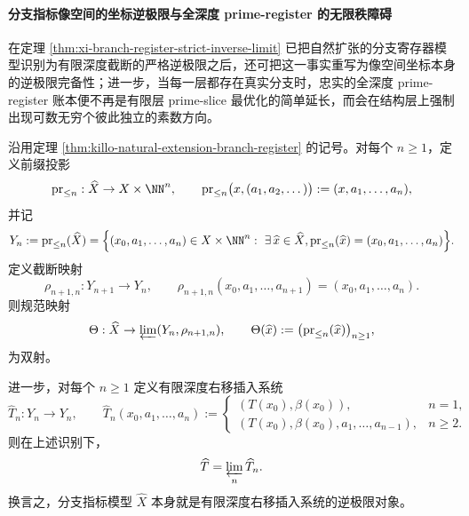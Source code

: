 \paragraph{分支指标像空间的坐标逆极限与全深度 prime-register 的无限秩障碍}
在定理 \ref{thm:xi-branch-register-strict-inverse-limit} 已把自然扩张的分支寄存器模型识别为有限深度截断的严格逆极限之后，还可把这一事实重写为像空间坐标本身的逆极限完备性；进一步，当每一层都存在真实分支时，忠实的全深度 prime-register 账本便不再是有限层 prime-slice 最优化的简单延长，而会在结构层上强制出现可数无穷个彼此独立的素数方向。

\begin{theorem}[分支指标像空间本身就是有限截断坐标系的规范逆极限]\label{thm:xi-branch-register-image-coordinate-inverse-limit}
沿用定理 \ref{thm:killo-natural-extension-branch-register} 的记号。对每个 \(n\ge 1\)，定义前缀投影
\[
\mathrm{pr}_{\le n}:\widehat X\to X\times \NN^n,
\qquad
\mathrm{pr}_{\le n}\bigl(x,(a_1,a_2,\dots)\bigr):=(x,a_1,\dots,a_n),
\]
并记
\[
Y_n:=\mathrm{pr}_{\le n}(\widehat X)
=
\Bigl\{(x_0,a_1,\dots,a_n)\in X\times\NN^n:\ \exists\,\widehat x\in\widehat X,
\mathrm{pr}_{\le n}(\widehat x)=(x_0,a_1,\dots,a_n)\Bigr\}.
\]
定义截断映射
\[
\rho_{n+1,n}:Y_{n+1}\to Y_n,
\qquad
\rho_{n+1,n}(x_0,a_1,\dots,a_{n+1})=(x_0,a_1,\dots,a_n).
\]
则规范映射
\[
\Theta:\widehat X\to \varprojlim(Y_n,\rho_{n+1,n}),
\qquad
\Theta(\widehat x):=\bigl(\mathrm{pr}_{\le n}(\widehat x)\bigr)_{n\ge 1},
\]
为双射。

进一步，对每个 \(n\ge 1\) 定义有限深度右移插入系统
\[
\widehat T_n:Y_n\to Y_n,
\qquad
\widehat T_n(x_0,a_1,\dots,a_n):=
\begin{cases}
(T(x_0),\beta(x_0)),& n=1,\\
(T(x_0),\beta(x_0),a_1,\dots,a_{n-1}),& n\ge 2.
\end{cases}
\]
则在上述识别下，
\[
\widehat T=\varprojlim_n \widehat T_n.
\]
换言之，分支指标模型 \(\widehat X\) 本身就是有限深度右移插入系统的逆极限对象。
\end{theorem}
